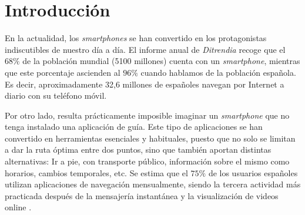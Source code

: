\chapter{Introducción}
\label{cap:introduccion}




	

En la actualidad, los \textit{smartphones} se han convertido en los protagonistas indiscutibles de nuestro día a día. El informe anual de \textit{Ditrendia} \citep{ditrendia2019informe} recoge que el $68\%$ de la población mundial (5100 millones) cuenta con un \textit{smartphone}, mientras que este porcentaje ascienden al $96\%$ cuando hablamos de la población española. Es decir, aproximadamente 32,6 millones de españoles navegan por Internet a diario con su teléfono móvil. 

Por otro lado, resulta prácticamente imposible imaginar un \textit{smartphone} que no tenga instalado una aplicación de guía. Este tipo de aplicaciones se han convertido en herramientas esenciales y habituales, puesto que no solo se limitan a dar la ruta óptima entre dos puntos, sino que también aportan distintas alternativas: Ir a pie, con transporte público, información sobre el mismo como horarios, cambios temporales, etc. Se estima que el $75\%$ de los usuarios españoles utilizan aplicaciones de navegación mensualmente, siendo la tercera actividad más practicada después de la mensajería instantánea y la visualización de videos online \citep{ditrendia2019informe}.

